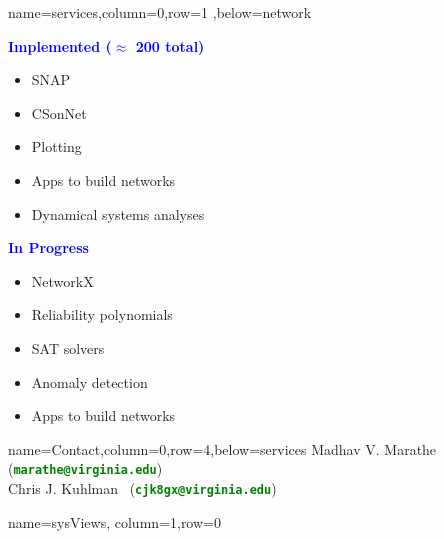 \documentclass[landscape,paperwidth=70in,paperheight=46in,fontscale=0.225]{baposter} %
\begin{document}
\begin{poster}
          {name=services,column=0,row=1 ,below=network}{
\begin{minipage}[t]{0.48 \textwidth}
\textcolor{blue}{\textbf{Implemented ($\approx$ 200 total)}}
\medskip
\begin{itemize}[leftmargin=*,noitemsep,topsep=0pt]
    \item SNAP  \smallskip
    \item CSonNet   \smallskip 
    \item Plotting  \smallskip
    \item Apps to build networks  \smallskip
    \item Dynamical systems analyses
\end{itemize}
\end{minipage}
\quad
\begin{minipage}[t]{0.48 \textwidth}
\textcolor{blue}{\textbf{In Progress}}\
  \medskip
\begin{itemize}[leftmargin=*,noitemsep,topsep=0pt]
    \item NetworkX    \smallskip
    \item Reliability polynomials    \smallskip
    \item SAT solvers    \smallskip
    \item Anomaly detection     \smallskip
    \item Apps to build networks    \smallskip
\end{itemize}
\end{minipage}
}

          {name=Contact,column=0,row=4,below=services}{
{\footnotesize
{Madhav V. Marathe~ (\textcolor{green}{\textbf{\texttt{marathe@virginia.edu}}})}\\
{Chris J. Kuhlman~ (\textcolor{green}{\textbf{\texttt{cjk8gx@virginia.edu}}})}
}}


          {name=sysViews, column=1,row=0}{

}
\end{poster}
\end{document}
